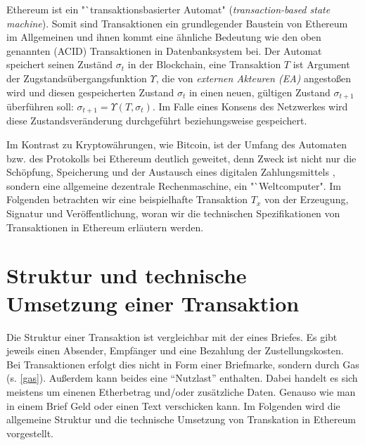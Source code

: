 \documentclass[runningheads]{llncs}
\begin{document}
Ethereum ist ein "`transaktionsbasierter Automat" (\textit{transaction-based state machine}). Somit sind Transaktionen ein grundlegender Baustein von Ethereum im Allgemeinen und ihnen kommt eine ähnliche Bedeutung wie den oben genannten (ACID) Transaktionen in Datenbanksystem bei. Der Automat speichert seinen Zuständ $ \sigma_t $ in der Blockchain, eine Transaktion $ T $ ist Argument der Zugstandsübergangsfunktion $ \Upsilon $, die von \textit{externen Akteuren (EA)} angestoßen wird und diesen gespeicherten Zustand $ \sigma_t $ in einen neuen, gültigen Zustand $ \sigma_{t + 1} $ überführen soll: $\sigma_{t+1} = \Upsilon(T, \sigma_t) $. Im Falle eines Konsens des Netzwerkes wird diese Zustandsveränderung durchgeführt beziehungsweise gespeichert.

Im Kontrast zu Kryptowährungen, wie Bitcoin, ist der Umfang des Automaten bzw. des Protokolls bei Ethereum deutlich geweitet, denn Zweck ist nicht nur die Schöpfung, Speicherung und der Austausch eines digitalen Zahlungsmittels \cite{nakamoto_bitcoin_nodate}, sondern eine allgemeine dezentrale Rechenmaschine, ein "`Weltcomputer".  \cite[S. 1-4]{wood_ethereum/yellowpaper_2019} Im Folgenden betrachten wir eine beispielhafte Transaktion $ T_x $ von der Erzeugung, Signatur und Veröffentlichung, woran wir die technischen Spezifikationen von Transaktionen in Ethereum erläutern werden.

\section{Struktur und technische Umsetzung einer Transaktion}
Die Struktur einer Transaktion ist vergleichbar mit der eines Briefes. Es gibt jeweils einen Absender, Empfänger und eine Bezahlung der Zustellungskosten. Bei Transaktionen erfolgt dies nicht in Form einer Briefmarke, sondern durch Gas (s. \ref{gas}). Außerdem kann beides eine "`Nutzlast"' \cite[S. 108]{antonopoulos_mastering_2019} enthalten. Dabei handelt es sich meistens um einenen Etherbetrag und/oder zusätzliche Daten. Genauso wie man in einem Brief Geld oder einen Text verschicken kann. Im Folgenden wird die allgemeine Struktur und die technische Umsetzung von Transkation in Ethereum vorgestellt.
\end{document}
